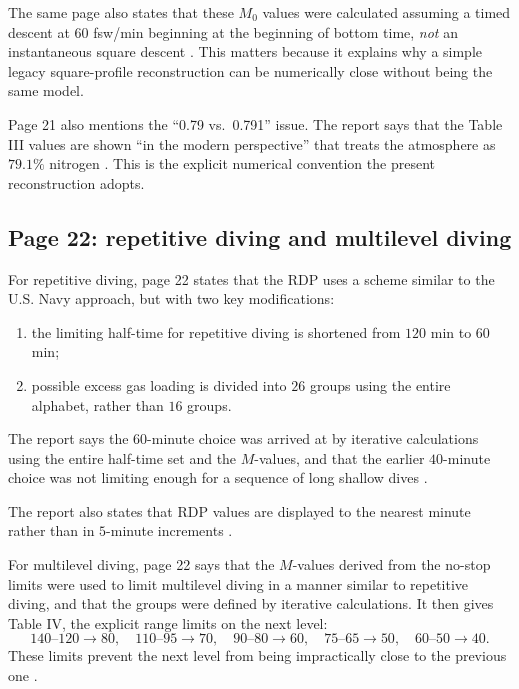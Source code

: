 \documentclass[11pt]{article}
\begin{document}
The same page also states that these $M_0$ values were calculated assuming a timed descent at $60$ fsw/min beginning at the beginning of bottom time, \emph{not} an instantaneous square descent \cite[p.~21]{Hamilton1994}. This matters because it explains why a simple legacy square-profile reconstruction can be numerically close without being the same model.

Page 21 also mentions the ``0.79 vs.\ 0.791'' issue. The report says that the Table III values are shown ``in the modern perspective'' that treats the atmosphere as $79.1\%$ nitrogen \cite[p.~21]{Hamilton1994}. This is the explicit numerical convention the present reconstruction adopts.

\subsection{Page 22: repetitive diving and multilevel diving}

For repetitive diving, page 22 states that the RDP uses a scheme similar to the U.S. Navy approach, but with two key modifications:
\begin{enumerate}[label=(\alph*)]
\item the limiting half-time for repetitive diving is shortened from $120$ min to $60$ min;
\item possible excess gas loading is divided into $26$ groups using the entire alphabet, rather than $16$ groups.
\end{enumerate}
The report says the $60$-minute choice was arrived at by iterative calculations using the entire half-time set and the $M$-values, and that the earlier $40$-minute choice was not limiting enough for a sequence of long shallow dives \cite[p.~22]{Hamilton1994}.

The report also states that RDP values are displayed to the nearest minute rather than in $5$-minute increments \cite[p.~22]{Hamilton1994}.

For multilevel diving, page 22 says that the $M$-values derived from the no-stop limits were used to limit multilevel diving in a manner similar to repetitive diving, and that the groups were defined by iterative calculations. It then gives Table IV, the explicit range limits on the next level:
\[
140\text{--}120 \to 80,\quad
110\text{--}95 \to 70,\quad
90\text{--}80 \to 60,\quad
75\text{--}65 \to 50,\quad
60\text{--}50 \to 40.
\]
These limits prevent the next level from being impractically close to the previous one \cite[p.~22]{Hamilton1994}.
\end{document}
